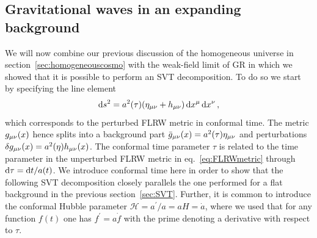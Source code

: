 \subsection{Gravitational waves in an expanding background} \label{sec:GWinFLRW}

We will now combine our previous discussion of the homogeneous universe in section~\ref{sec:homogeneouscosmo} with the weak-field limit of \ac{GR} in which we showed that it is possible to perform an \ac{SVT} decomposition. To do so we start by specifying the line element
\begin{align}
	\mathop{}\!\mathrm{d} s^2 = a^2(\tau) (\eta_{{\mu \nu}} + h_{{\mu \nu}}) \mathop{}\!\mathrm{d} x^\mu \mathop{}\!\mathrm{d} x^\nu \, , \label{eq:perturbedFLRW}
\end{align}
which corresponds to the perturbed \ac{FLRW} metric in conformal time. The metric $g_{{\mu \nu}}(x)$ hence splits into a background part $\bar{g}_{{\mu \nu}}(x) = a^2(\tau) \eta_{{\mu \nu}}$ and perturbations $\delta g_{{\mu \nu}}(x) = a^2(\eta) h_{{\mu \nu}}(x)$.  The conformal time parameter $\tau$ is  related to the time parameter in the unperturbed \ac{FLRW} metric in eq.~\eqref{eq:FLRWmetric} through $\mathop{}\!\mathrm{d} \tau = \mathop{}\!\mathrm{d} t / a(t)$. We introduce conformal time here in order to show that the following \ac{SVT} decomposition closely parallels the one performed for a flat background in the previous section~\ref{sec:SVT}. Further, it is common to introduce the conformal Hubble parameter $\mathcal{H} = a^\prime / a = a H = \dot{a}$, where we used that for any function $f(t)$ one has $f^\prime = a \dot f$ with the prime denoting a derivative with respect to $\tau$.

